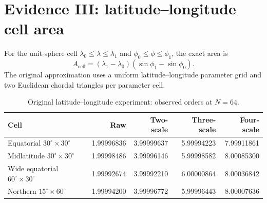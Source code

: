\documentclass[11pt]{article}
\theoremstyle{remark}
\begin{document}
\section{Evidence III: latitude--longitude cell area}
For the unit-sphere cell $\lambda_0\le\lambda\le\lambda_1$ and $\phi_0\le\phi\le\phi_1$, the
exact area is
\[
A_{\mathrm{cell}}=(\lambda_1-\lambda_0)(\sin\phi_1-\sin\phi_0).
\]
The original approximation uses a uniform latitude--longitude parameter grid and two Euclidean
chordal triangles per parameter cell.

\begin{table}[ht]
\centering
\begin{tabular}{lrrrr}
\toprule
Cell & Raw & Two-scale & Three-scale & Four-scale\\
\midrule
Equatorial $30^\circ\times30^\circ$ & 1.99996836 & 3.99999637 & 5.99994223 & 7.99911861\\
Midlatitude $30^\circ\times30^\circ$ & 1.99998486 & 3.99996146 & 5.99998582 & 8.00085300\\
Wide equatorial $60^\circ\times30^\circ$ & 1.99992674 & 3.99992210 & 6.00000864 & 8.00036842\\
Northern $15^\circ\times60^\circ$ & 1.99994200 & 3.99996772 & 5.99996443 & 8.00007636\\
\bottomrule
\end{tabular}
\caption{Original latitude--longitude experiment: observed orders at $N=64$.}
\end{table}
\end{document}
